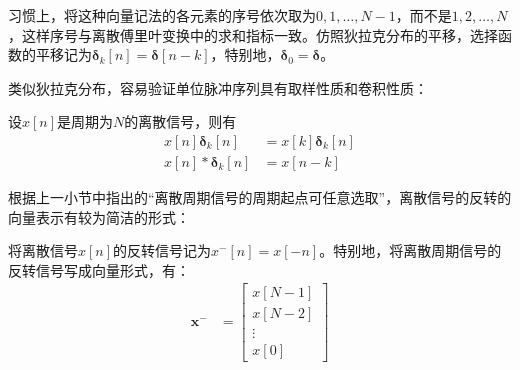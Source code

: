 习惯上，将这种向量记法的各元素的序号依次取为$0,1,\dots,N-1$，而不是$1,2,\dots,N$，这样序号与离散傅里叶变换中的求和指标一致。仿照狄拉克分布的平移，选择函数的平移记为$\boldsymbol{\delta}_k[n]=\boldsymbol{\delta}[n-k]$，特别地，$\boldsymbol{\delta}_0=\boldsymbol{\delta}$。

类似狄拉克分布，容易验证单位脉冲序列具有取样性质和卷积性质：
\begin{proposition}
    设$x[n]$是周期为$N$的离散信号，则有
    \begin{align*}
        x[n]\boldsymbol{\delta}_k[n]&=x[k]\boldsymbol{\delta}_k[n]\\
        x[n]*\boldsymbol{\delta}_k[n]&=x[n-k]
    \end{align*}
\end{proposition}

根据上一小节中指出的“离散周期信号的周期起点可任意选取”，离散信号的反转的向量表示有较为简洁的形式：

\begin{definition}[离散信号的反转]
    将离散信号$x[n]$的反转信号记为$x^-[n]=x[-n]$。特别地，将离散周期信号的反转信号写成向量形式，有：
    \begin{align*}
    \textbf{x}^-&=\begin{bmatrix}
x[N-1]  \\
x[N-2]  \\
\vdots \\
x[0]
\end{bmatrix}\end{align*}
\end{definition}

